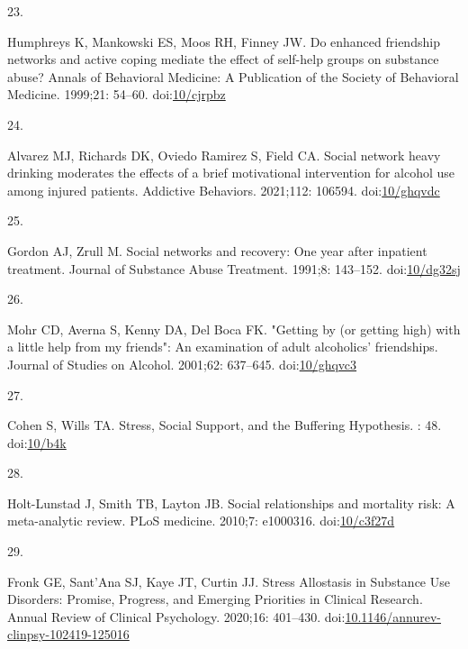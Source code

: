 \documentclass[
  letterpaper,
  DIV=11,
  numbers=noendperiod]{scrartcl}
\newlength{\cslhangindent}
\newlength{\csllabelwidth}
\newenvironment{CSLReferences}[2] %
 {\begin{list}{}{%
  \setlength{\itemindent}{0pt}
  \setlength{\leftmargin}{0pt}
  \setlength{\parsep}{0pt}
  \ifodd #1
   \setlength{\leftmargin}{\cslhangindent}
   \setlength{\itemindent}{-1\cslhangindent}
  \fi
  \setlength{\itemsep}{#2\baselineskip}}}
 {\end{list}}
\newcommand{\CSLLeftMargin}[1]{\parbox[t]{\csllabelwidth}{\strut#1\strut}}
\newcommand{\CSLRightInline}[1]{\parbox[t]{\linewidth - \csllabelwidth}{\strut#1\strut}}
\begin{document}
\begin{CSLReferences}{0}{1}
\CSLLeftMargin{23. }%
\CSLRightInline{Humphreys K, Mankowski ES, Moos RH, Finney JW. Do
enhanced friendship networks and active coping mediate the effect of
self-help groups on substance abuse? Annals of Behavioral Medicine: A
Publication of the Society of Behavioral Medicine. 1999;21: 54--60.
doi:\href{https://doi.org/10/cjrpbz}{10/cjrpbz}}

\CSLLeftMargin{24. }%
\CSLRightInline{Alvarez MJ, Richards DK, Oviedo Ramirez S, Field CA.
Social network heavy drinking moderates the effects of a brief
motivational intervention for alcohol use among injured patients.
Addictive Behaviors. 2021;112: 106594.
doi:\href{https://doi.org/10/ghqvdc}{10/ghqvdc}}

\CSLLeftMargin{25. }%
\CSLRightInline{Gordon AJ, Zrull M. Social networks and recovery: {One}
year after inpatient treatment. Journal of Substance Abuse Treatment.
1991;8: 143--152. doi:\href{https://doi.org/10/dg32sj}{10/dg32sj}}

\CSLLeftMargin{26. }%
\CSLRightInline{Mohr CD, Averna S, Kenny DA, Del Boca FK. "{Getting} by
(or getting high) with a little help from my friends": An examination of
adult alcoholics' friendships. Journal of Studies on Alcohol. 2001;62:
637--645. doi:\href{https://doi.org/10/ghqvc3}{10/ghqvc3}}

\CSLLeftMargin{27. }%
\CSLRightInline{Cohen S, Wills TA. Stress, {Social Support}, and the
{Buffering Hypothesis}. : 48. doi:\href{https://doi.org/10/b4k}{10/b4k}}

\CSLLeftMargin{28. }%
\CSLRightInline{Holt-Lunstad J, Smith TB, Layton JB. Social
relationships and mortality risk: A meta-analytic review. PLoS medicine.
2010;7: e1000316. doi:\href{https://doi.org/10/c3f27d}{10/c3f27d}}

\CSLLeftMargin{29. }%
\CSLRightInline{Fronk GE, Sant'Ana SJ, Kaye JT, Curtin JJ. Stress
{Allostasis} in {Substance Use Disorders}: {Promise}, {Progress}, and
{Emerging Priorities} in {Clinical Research}. Annual Review of Clinical
Psychology. 2020;16: 401--430.
doi:\href{https://doi.org/10.1146/annurev-clinpsy-102419-125016}{10.1146/annurev-clinpsy-102419-125016}}


\end{CSLReferences}
\end{document}
